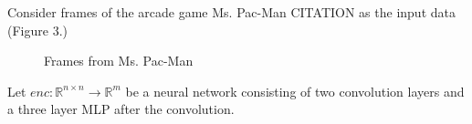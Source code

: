 \documentclass{article}
\begin{document}
Consider frames of the arcade game Ms. Pac-Man CITATION as the input data (Figure 3.)
\begin{figure}
    \centering
    \qquad
    \caption{Frames from Ms. Pac-Man}
\end{figure}



Let $enc: \mathbb{R}^{n \times n} \xrightarrow{} \mathbb{R}^{m}$ be a neural network consisting of 
two convolution layers and a three layer MLP after the convolution. \newline




$$$$
\end{document}

